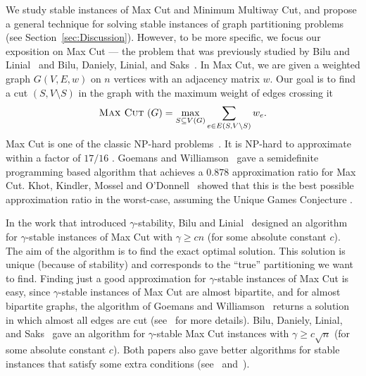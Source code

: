 \documentclass[twoside,leqno,twocolumn]{article}
\newcommand{\maxcut}{\textsc{Max Cut}~}
\begin{document}
We study stable instances of Max Cut and Minimum Multiway Cut, and propose a general technique for solving 
stable instances of graph partitioning problems (see Section~\ref{sec:Discussion}). However, to be more specific,
we focus  our exposition on Max Cut --- the problem that was previously studied by Bilu and Linial~\cite{BL} and Bilu, Daniely, Linial, and Saks~\cite{BDLS}.
In Max Cut, we are given a weighted graph $G(V,E,w)$ on $n$ vertices with an adjacency matrix $w$. Our goal is to find a cut $(S, V \setminus S)$ in the graph with the maximum weight of edges crossing it
$$\maxcut(G)= \max_{S \subseteq V(G)} \sum_{e \in E(S, V\setminus S)} w_e.$$
Max Cut is one of the classic NP-hard problems~\cite{GJ}. It is NP-hard to approximate within a factor of $17/16$ \cite{Hastad,TSSW}.
Goemans and Williamson~\cite{GW} gave a semidefinite programming based algorithm that achieves a $0.878$ approximation ratio for Max Cut. Khot, Kindler, Mossel and O'Donnell~\cite{KKMO} showed that this is the best possible approximation ratio in the worst-case, assuming the Unique Games Conjecture \cite{Khot}.

In the work that introduced $\gamma$-stability, Bilu and Linial~\cite{BL} designed an algorithm for $\gamma$-stable instances of Max Cut with $\gamma \geq cn$ (for some absolute constant $c$). The aim of 
the algorithm is to find the exact optimal solution. This solution is unique (because of stability) and corresponds to the ``true'' partitioning we want to find. Finding just a good approximation for $\gamma$-stable instances of Max Cut is easy, 
since $\gamma$-stable instances of Max Cut are almost bipartite, and for almost bipartite graphs, the algorithm of Goemans and Williamson~\cite{GW} 
returns a solution in which almost all edges are cut (see~\cite{BL} for more details). Bilu, Daniely, Linial, and Saks~\cite{BDLS} gave an algorithm for $\gamma$-stable Max Cut instances with $\gamma  \geq c \sqrt{n}$ (for some absolute constant $c$). Both papers also gave better algorithms for
stable instances that satisfy some extra conditions (see~\cite{BL} and~\cite{BDLS}). 
 
\end{document}
